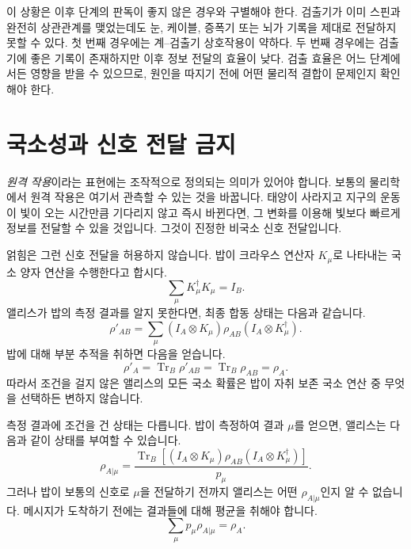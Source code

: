 이 상황은 이후 단계의 판독이 좋지 않은 경우와 구별해야 한다. 검출기가 이미 스핀과 완전히 상관관계를 맺었는데도 눈, 케이블, 증폭기 또는 뇌가 기록을 제대로 전달하지 못할 수 있다. 첫 번째 경우에는 계--검출기 상호작용이 약하다. 두 번째 경우에는 검출기에 좋은 기록이 존재하지만 이후 정보 전달의 효율이 낮다. 검출 효율은 어느 단계에서든 영향을 받을 수 있으므로, 원인을 따지기 전에 어떤 물리적 결합이 문제인지 확인해야 한다.

\begin{classroomqa}
\end{classroomqa}

\section{국소성과 신호 전달 금지}

\emph{원격 작용}이라는 표현에는 조작적으로 정의되는 의미가 있어야 합니다. 보통의 물리학에서 원격 작용은 여기서 관측할 수 있는 것을 바꿉니다. 태양이 사라지고 지구의 운동이 빛이 오는 시간만큼 기다리지 않고 즉시 바뀐다면, 그 변화를 이용해 빛보다 빠르게 정보를 전달할 수 있을 것입니다. 그것이 진정한 비국소 신호 전달입니다.

얽힘은 그런 신호 전달을 허용하지 않습니다. 밥이 크라우스 연산자 \(K_\mu\)로 나타내는 국소 양자 연산을 수행한다고 합시다.
\begin{equation}
\sum_\mu K_\mu^\dagger K_\mu=I_B.
\end{equation}
앨리스가 밥의 측정 결과를 알지 못한다면, 최종 합동 상태는 다음과 같습니다.
\begin{equation}
\rho'_{AB}
=\sum_\mu
(I_A\otimes K_\mu)\rho_{AB}
(I_A\otimes K_\mu^\dagger).
\end{equation}
밥에 대해 부분 추적을 취하면 다음을 얻습니다.
\begin{equation}
\rho'_A
=\operatorname{Tr}_B\rho'_{AB}
=\operatorname{Tr}_B\rho_{AB}
=\rho_A.
\label{eq:l7-no-signaling}
\end{equation}
따라서 조건을 걸지 않은 앨리스의 모든 국소 확률은 밥이 자취 보존 국소 연산 중 무엇을 선택하든 변하지 않습니다.

측정 결과에 조건을 건 상태는 다릅니다. 밥이 측정하여 결과 \(\mu\)를 얻으면, 앨리스는 다음과 같이 상태를 부여할 수 있습니다.
\begin{equation}
\rho_{A|\mu}
=\frac{
\operatorname{Tr}_B\!\left[
(I_A\otimes K_\mu)\rho_{AB}
(I_A\otimes K_\mu^\dagger)
\right]
}{p_\mu}.
\label{eq:l7-conditioned-state}
\end{equation}
그러나 밥이 보통의 신호로 \(\mu\)을 전달하기 전까지 앨리스는 어떤 \(\rho_{A|\mu}\)인지 알 수 없습니다. 메시지가 도착하기 전에는 결과들에 대해 평균을 취해야 합니다.
\begin{equation}
\sum_\mu p_\mu\rho_{A|\mu}=\rho_A.
\label{eq:l7-conditioned-average}
\end{equation}

